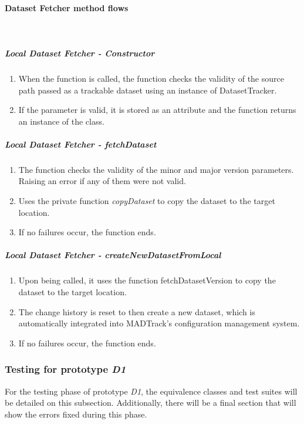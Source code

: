 \paragraph{Dataset Fetcher method flows} \mbox{}\\

\subparagraph{Local Dataset Fetcher - Constructor}

\begin{enumerate}
    \item When the function is called, the function checks the validity of the source path passed as a trackable dataset using an instance of DatasetTracker.
    \item If the parameter is valid, it is stored as an attribute and the function returns an instance of the class.
\end{enumerate}

\subparagraph{Local Dataset Fetcher - fetchDataset}

\begin{enumerate}
    \item The function checks the validity of the minor and major version parameters. Raising an error if any of them were not valid.
    \item Uses the private function \emph{copyDataset} to copy the dataset to the target location.
    \item If no failures occur, the function ends.
\end{enumerate}

\subparagraph{Local Dataset Fetcher - createNewDatasetFromLocal}

\begin{enumerate}
    \item Upon being called, it uses the function fetchDatasetVersion to copy the dataset to the target location.
    \item The change history is reset to then create a new dataset, which is automatically integrated into MADTrack's configuration management system.
    \item If no failures occur, the function ends.
\end{enumerate}

\subsubsection{Testing for prototype \emph{D1}}

For the testing phase of prototype \emph{D1}, the equivalence classes and test suites will be detailed on this subsection. Additionally, there will be a final section
that will show the errors fixed during this phase.

